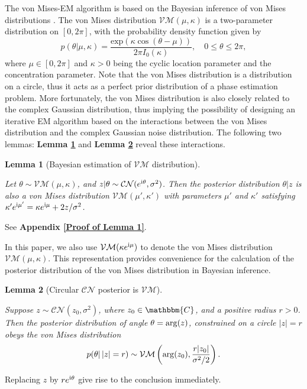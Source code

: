 \documentclass[journal,twocolumn]{IEEEtran}
\newtheorem{lemma}{\bf Lemma}
\theoremstyle{nonumberplain}
\def \exp {\text{exp}}
\def \CN {\mathcal{CN}}
\def \VM {\mathcal{VM}}
\def \ri {{\rm i}}
\begin{document}
    The von Mises-EM algorithm is based on the Bayesian inference of von Mises distributions \cite{mardia1976bayesian}. The von Mises distribution $\VM(\mu, \kappa)$ is a two-parameter distribution on $[0, 2\pi]$, with the probability density function given by 
    \begin{equation}
        p(\theta|\mu, \kappa) = \frac{\exp(\kappa \cos(\theta - \mu))}{2\pi I_0(\kappa)}, \quad 0\leq \theta \leq 2\pi,
    \end{equation}
    where $\mu \in [0,2\pi]$ and $\kappa >0$ being the cyclic location parameter and the concentration parameter. 
    Note that the von Mises distribution is a distribution on a circle, thus it acts as a perfect prior distribution of a phase estimation problem. 
    More fortunately, the von Mises distribution is also closely related to the complex Gaussian distribution, thus implying the possibility of designing an iterative EM algorithm \cite{casella2021statistical} based on the interactions between the von Mises distribution and the complex Gaussian noise distribution. The following two lemmas: {\bf Lemma \ref{lemma_1}} and {\bf Lemma \ref{lemma_2}} reveal these interactions. 
    \begin{lemma}[Bayesian estimation of $\VM$ distribution]\label{lemma_1} \mbox{}\par
        Let $\theta \sim \VM(\mu, \kappa)$, and $z|\theta \sim \CN(e^{{\ri}\theta}, \sigma^2)$. Then the posterior distribution $\theta | z$ is also a von Mises distribution $\VM(\mu', \kappa')$ with parameters $\mu'$ and $\kappa'$ satisfying $\kappa' e^{{\ri}\mu'} = \kappa e^{{\ri}\mu} + 2z/\sigma^2$.
    \end{lemma}
        \begin{IEEEproof}
        See {\bf Appendix \ref{Proof of Lemma 1}}. 
    \end{IEEEproof}
    
    In this paper, we also use $\VM(\kappa e^{{\ri}\mu})$ to denote the von Mises distribution $\VM(\mu, \kappa)$. 
    This representation provides convenience for the calculation of the posterior distribution of the von Mises distribution in Bayesian inference.

    \begin{lemma}[Circular $\CN$ posterior is $\VM$]\label{lemma_2} \mbox{}\par
        Suppose $z \sim \CN(z_0, \sigma^2)$, where $z_0 \in \mathbbm{C}$, and a positive radius $r>0$. Then the posterior distribution of angle $\theta= {\rm arg} (z)$, constrained on a circle $|z|=r$ obeys the von Mises distribution
        \begin{equation}
            p(\theta |\, |z|=r) \sim \VM\left({\rm arg}(z_0), \frac{r|z_0|}{\sigma^2/2}\right).
        \end{equation}
    \end{lemma}
    \begin{IEEEproof}
        Replacing $z$ by $r e^{\ri \theta}$ give rise to the conclusion immediately. 
    \end{IEEEproof}
    
\end{document}
